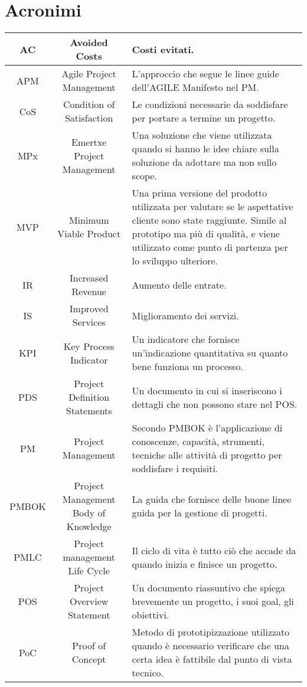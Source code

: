 \section{Acronimi}

\begin{tabularx}{\textwidth}{|c|c|X|}
	\hline
	AC & Avoided Costs & Costi evitati.\\
	\hline
	APM & Agile Project Management & L'approccio che segue le linee guide dell'AGILE Manifesto nel PM.\\
	\hline
	CoS & Condition of Satisfaction & Le condizioni necessarie da soddisfare per portare a termine un progetto. \\
	\hline
	MPx & Emertxe Project Management & 
	Una soluzione che viene utilizzata quando si hanno le idee chiare sulla soluzione da adottare ma non sullo scope.\\
	\hline
	MVP & Minimum Viable Product & Una prima versione del prodotto utilizzata per valutare se le aspettative cliente sono state raggiunte. Simile al prototipo ma più di qualità, e viene utilizzato come punto di partenza per lo sviluppo ulteriore. \\
	\hline
	IR & Increased Revenue & Aumento delle entrate.\\
	\hline
	IS & Improved Services & Miglioramento dei servizi.\\
	\hline
	KPI & Key Process Indicator & Un indicatore che fornisce un'indicazione quantitativa su quanto bene funziona un processo. \\
	\hline
	PDS & Project Definition Statements & Un documento in cui si inseriscono i dettagli che non possono stare nel POS.\\
	\hline
	PM & Project Management & Secondo PMBOK è l'applicazione di conoscenze, capacità, strumenti, tecniche alle attività di progetto per soddisfare i requisiti.\\
	\hline
	PMBOK & Project Management Body of Knowledge & La guida che fornisce delle buone linee guida per la gestione di progetti.\\
	\hline
	PMLC & Project management Life Cycle & Il ciclo di vita è tutto ciò che accade da quando inizia e finisce un progetto.\\
	\hline
	POS & Project Overview Statement & Un documento riassuntivo che spiega brevemente un progetto, i suoi goal, gli obiettivi. \\
	\hline
	PoC & Proof of Concept & Metodo di prototipizzazione utilizzato quando è necessario verificare che una certa idea è fattibile dal punto di vista tecnico.\\

\end{tabularx}
